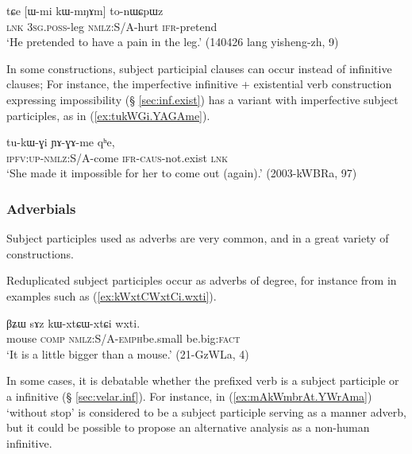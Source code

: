 \begin{exe}
\ex \label{ex:Wmi.kWmNAm.tonWCpWznW}
 \gll  tɕe [ɯ-mi kɯ-mŋɤm] to-nɯɕpɯz  \\
 \textsc{lnk} \textsc{3sg}.\textsc{poss}-leg \textsc{nmlz}:S/A-hurt \textsc{ifr}-pretend \\
 \glt `He pretended to have a pain in the leg.' (140426 lang yisheng-zh, 9)
\end{exe}

In some constructions, subject participial clauses can occur instead of infinitive clauses; For instance, the imperfective  infinitive + existential verb construction expressing impossibility (§ \ref{sec:inf.exist}) has a variant with imperfective subject participles, as in (\ref{ex:tukWGi.YAGAme}). 

 \begin{exe}
\ex \label{ex:tukWGi.YAGAme}
 \gll   tu-kɯ-ɣi ɲɤ-ɣɤ-me qʰe,  \\
  \textsc{ipfv}:\textsc{up}-\textsc{nmlz}:S/A-come \textsc{ifr}-\textsc{caus}-not.exist \textsc{lnk} \\
  \glt `She made it impossible for her to come out (again).' (2003-kWBRa, 97)
 \end{exe}
 
\subsubsection{Adverbials} \label{ex:subject.participle.adverbial}
Subject participles used as adverbs are very common, and in a great variety of constructions.

Reduplicated subject participles occur as adverbs of degree, for instance  from  in examples such as (\ref{ex:kWxtCWxtCi.wxti}).

\begin{exe}
\ex \label{ex:kWxtCWxtCi.wxti}
 \gll βʑɯ sɤz kɯ-xtɕɯ-xtɕi wxti. \\
 mouse \textsc{comp} \textsc{nmlz}:S/A-\textsc{emph}\redp{}be.small be.big:\textsc{fact} \\
 \glt `It is a little bigger than a mouse.' (21-GzWLa, 4)
\end{exe}

In some cases, it is debatable whether the  prefixed verb is a subject participle or a  infinitive (§ \ref{sec:velar.inf}). For instance, in (\ref{ex:mAkWmbrAt.YWrAma})  `without stop' is considered to be a subject participle serving as a manner adverb, but it could be possible to propose an alternative analysis as a non-human infinitive.

